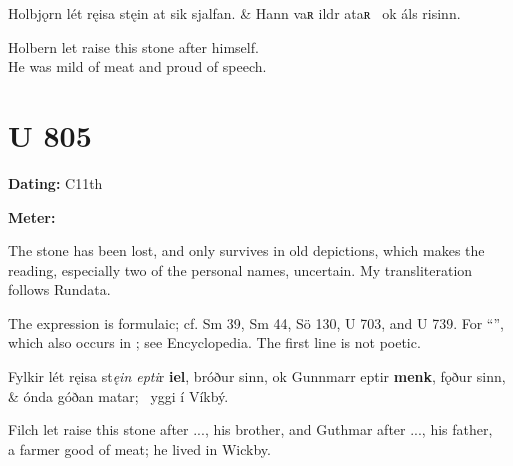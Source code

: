 \sectionline

\bvg\bva[]%
Holbjǫrn lét ręisa stęin at sik sjalfan. &
Hann vaʀ ildr ataʀ \hld\ ok áls risinn.\eva

\bvb Holbern let raise this stone after himself. \\
He was mild of meat and proud of speech.\evb\evg

\sectionline

\section{U 805}

\begin{flushright}%
\textbf{Dating:} C11th

\textbf{Meter:} \Fornyrdislag
\end{flushright}%

The stone has been lost, and only survives in old depictions, which makes the reading, especially two of the personal names, uncertain.  My transliteration follows Rundata.

The expression is formulaic; cf. Sm 39, Sm 44, Sö 130, U 703, and U 739.  For “”, which also occurs in \Havamal; see Encyclopedia.  The first line is not poetic.

\sectionline

\bvg\bva[]%
Fylkir lét ręisa st\emph{ęin epti}r \textbf{iel}, bróður sinn, ok Gunnmarr eptir \textbf{menk}, fǫður sinn, &
ónda góðan matar; \hld\ yggi í Víkbý.\eva

\bvb Filch let raise this stone after ..., his brother, and Guthmar after ..., his father, \\
a farmer good of meat; he lived in Wickby.\evb\evg

\sectionline
